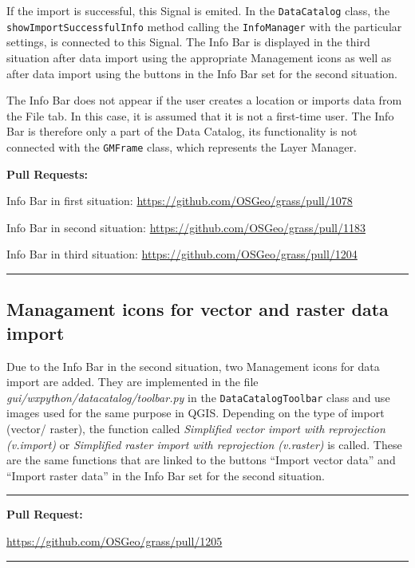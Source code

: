 \documentclass[a4paper,10pt,twoside]{article}
\begin{document}
\noindent If the import is successful, this Signal is emited. In the \texttt{DataCatalog} class, the \texttt{showImportSuccessfulInfo} method calling the \texttt{InfoManager} with the particular settings, is connected to this Signal. The Info Bar is displayed in the third situation after data import using the appropriate Management icons as well as after data import using the buttons in the Info Bar set for the second situation.

The Info Bar does not appear if the user creates a location or imports data from the File tab. In this case, it is assumed that it is not a first-time user. The Info Bar is therefore only a part of the Data Catalog, its functionality is not connected with the \texttt{GMFrame} class, which represents the Layer Manager.

\newpage
\noindent \textbf{Pull Requests:}

Info Bar in first situation: \url{https://github.com/OSGeo/grass/pull/1078}

Info Bar in second situation: \url{https://github.com/OSGeo/grass/pull/1183}

Info Bar in third situation: \url{https://github.com/OSGeo/grass/pull/1204}
\par\noindent\rule{\textwidth}{0.4pt}

\subsection{Managament icons for vector and raster data import}

\noindent \large Due to the Info Bar in the second situation, two Management icons for data import are added. They are implemented in the file \textit{gui/wxpython/datacatalog/toolbar.py} in the \texttt{DataCatalogToolbar} class and use images used for the same purpose in QGIS. Depending on the type of import (vector/ raster), the function called \textit{Simplified vector import with reprojection (v.import)} or \textit{Simplified raster import with reprojection (v.raster)} is called. These are the same functions that are linked to the buttons ``Import vector data'' and ``Import raster data'' in the Info Bar set for the second situation.

\par\noindent\rule{\textwidth}{0.4pt}
\textbf{Pull Request:}

\url{https://github.com/OSGeo/grass/pull/1205}
\par\noindent\rule{\textwidth}{0.4pt}
\end{document}

